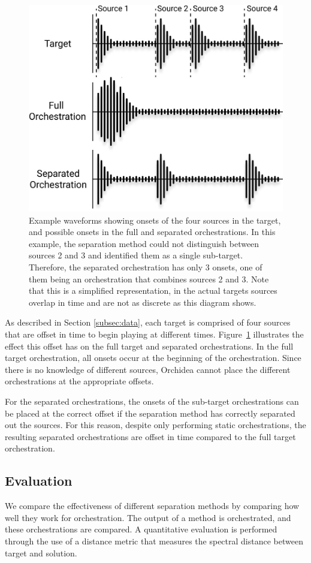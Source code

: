 \documentclass{article}
\begin{document}
    \begin{figure}
    \centering
      \includegraphics[width=0.7\columnwidth]{figures/orch.jpg}
      \caption{Example waveforms showing onsets of the four sources in the target, and possible onsets in the full and separated orchestrations. In this example, the separation method could not distinguish between sources 2 and 3 and identified them as a single sub-target. Therefore, the separated orchestration has only 3 onsets, one of them being an orchestration that combines sources 2 and 3. Note that this is a simplified representation, in the actual targets sources overlap in time and are not as discrete as this diagram shows.}\label{fig:orchestrations}
    \end{figure}    
    
    As described in Section \ref{subsec:data}, each target is comprised of four sources that are offset in time to begin playing at different times. Figure~\ref{fig:orchestrations} illustrates the effect this offset has on the full target and separated orchestrations. In the full target orchestration, all onsets occur at the beginning of the orchestration. Since there is no knowledge of different sources, Orchidea cannot place the different orchestrations at the appropriate offsets. 
    
    For the separated orchestrations, the onsets of the sub-target orchestrations can be placed at the correct offset if the separation method has correctly separated out the sources. For this reason, despite only performing static orchestrations, the resulting separated orchestrations are offset in time compared to the full target orchestration.
    
    \subsection{Evaluation}
    We compare the effectiveness of different separation methods by comparing how well they work for orchestration. The output of a method is orchestrated, and these orchestrations are compared. A quantitative evaluation is performed through the use of a distance metric that measures the spectral distance between target and solution. 
    
\end{document}

